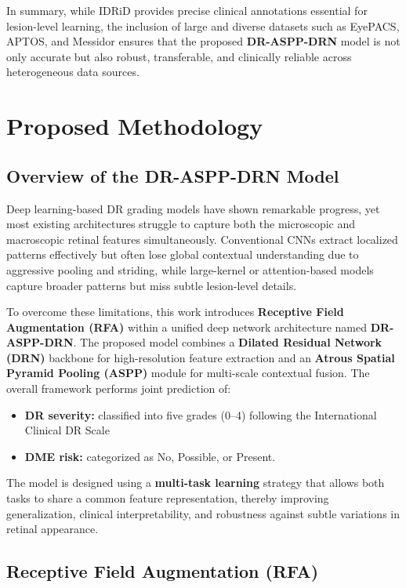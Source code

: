 \documentclass[12pt,a4paper]{article}
\begin{document}
In summary, while IDRiD provides precise clinical annotations essential for lesion-level learning, the inclusion of large and diverse datasets such as EyePACS, APTOS, and Messidor ensures that the proposed \textbf{DR-ASPP-DRN} model is not only accurate but also robust, transferable, and clinically reliable across heterogeneous data sources.



\section{Proposed Methodology}

\subsection{Overview of the DR-ASPP-DRN Model}
Deep learning-based DR grading models have shown remarkable progress, yet most existing architectures struggle to capture both the microscopic and macroscopic retinal features simultaneously.  
Conventional CNNs extract localized patterns effectively but often lose global contextual understanding due to aggressive pooling and striding, while large-kernel or attention-based models capture broader patterns but miss subtle lesion-level details.  

To overcome these limitations, this work introduces \textbf{Receptive Field Augmentation (RFA)} within a unified deep network architecture named \textbf{DR-ASPP-DRN}.  
The proposed model combines a \textbf{Dilated Residual Network (DRN)} backbone for high-resolution feature extraction and an \textbf{Atrous Spatial Pyramid Pooling (ASPP)} module for multi-scale contextual fusion.  
The overall framework performs joint prediction of:
\begin{itemize}
    \item \textbf{DR severity:} classified into five grades (0–4) following the International Clinical DR Scale
    \item \textbf{DME risk:} categorized as No, Possible, or Present.
\end{itemize}

The model is designed using a \textbf{multi-task learning} strategy that allows both tasks to share a common feature representation, thereby improving generalization, clinical interpretability, and robustness against subtle variations in retinal appearance.

\subsection{Receptive Field Augmentation (RFA)}
\end{document}
